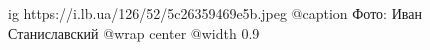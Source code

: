  
 
 
 
 

\ifcmt
  ig https://i.lb.ua/126/52/5c26359469e5b.jpeg
	@caption Фото: Иван Станиславский
  @wrap center
  @width 0.9
\fi
